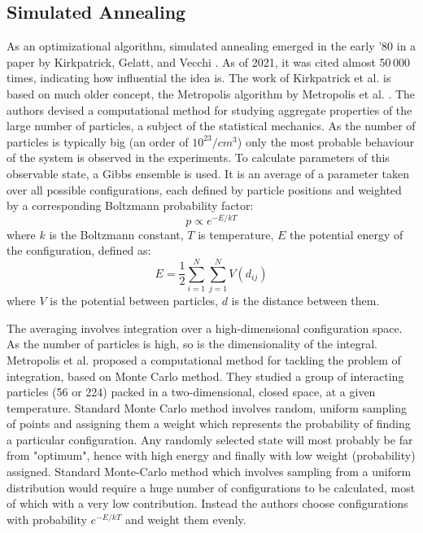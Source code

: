 \subsection{Simulated Annealing}
As an optimizational algorithm, simulated annealing emerged in the early '80 in a paper by Kirkpatrick, Gelatt, and Vecchi \cite{kirkpatrick_optimization_1983}. As of 2021, it was cited almost 50\,000 times, indicating how influential the idea is. The work of Kirkpatrick et al. is based on much older concept, the Metropolis algorithm by Metropolis et al. \cite{metropolis_equation_1953}. The authors devised a computational method for studying aggregate properties of the large number of particles, a subject of the statistical mechanics. As the number of particles is typically big (an order of $10^23/cm^3$) only the most probable behaviour of the system is observed in the experiments. To calculate parameters of this observable state, a Gibbs ensemble is used. It is an average of a parameter taken over all possible configurations, each defined by particle positions and weighted by a corresponding Boltzmann probability factor:
\[p\propto e^{-E/kT}\]
where $k$ is the Boltzmann constant, $T$ is temperature, $E$ the potential energy of the configuration, defined as:
\[E=\frac{1}{2}\sum_{i=1}^{N}\sum_{j=1}^{N}V(d_{ij})\]
where $V$ is the potential between particles, $d$ is the distance between them.

The averaging involves integration over a high-dimensional configuration space. As the number of particles is high, so is the dimensionality of the integral. Metropolis et al. proposed a computational method for tackling the problem of integration, based on Monte Carlo method. They studied a group of interacting particles (56 or 224) packed in a two-dimensional, closed space, at a given temperature. Standard Monte Carlo method involves random, uniform sampling of points and assigning them a weight which represents the probability of finding a particular configuration. Any randomly selected state will most probably be far from "optimum", hence with high energy and finally with low weight (probability) assigned. Standard Monte-Carlo method which involves sampling from a uniform distribution would require a huge number of configurations to be calculated, most of which with a very low contribution. Instead the authors choose configurations with probability $e^{-E/kT}$ and weight them evenly.

